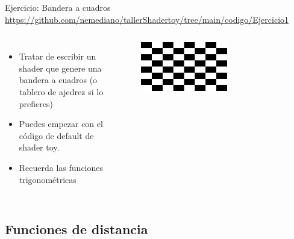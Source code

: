 \begin{frame}{Ejercicio: Bandera a cuadros}
\url{https://github.com/nemediano/tallerShadertoy/tree/main/codigo/Ejercicio1}
\begin{columns}
     \begin{itemize}
         \item Tratar de escribir un shader que genere una bandera a cuadros (o tablero de ajedrez si lo prefieres)
         \item Puedes empezar con el código de default de shader toy.
         \item Recuerda las funciones trigonométricas
     \end{itemize}
        \begin{figure}[htb]
            \centering
            \includegraphics[width=0.6\textwidth]{img/Ejer1}
        \end{figure}
\end{columns}
\end{frame}


\subsection{Funciones de distancia}

